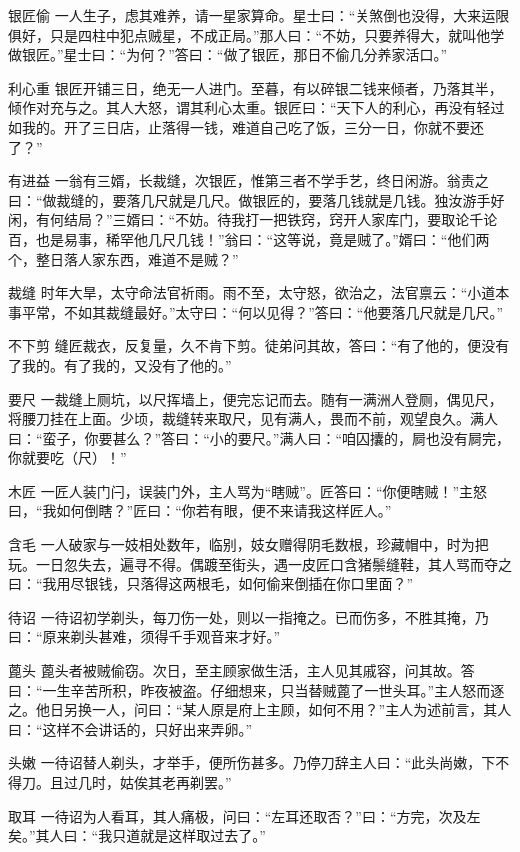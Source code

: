 \documentclass[12pt,UTF8]{ctexbook}
\begin{document}
银匠偷
一人生子，虑其难养，请一星家算命。星士曰：“关煞倒也没得，大来运限俱好，只是四柱中犯点贼星，不成正局。”那人曰：“不妨，只要养得大，就叫他学做银匠。”星士曰：“为何？”答曰：“做了银匠，那日不偷几分养家活口。”

利心重
银匠开铺三日，绝无一人进门。至暮，有以碎银二钱来倾者，乃落其半，倾作对充与之。其人大怒，谓其利心太重。银匠曰：“天下人的利心，再没有轻过如我的。开了三日店，止落得一钱，难道自己吃了饭，三分一日，你就不要还了？”

有进益
一翁有三婿，长裁缝，次银匠，惟第三者不学手艺，终日闲游。翁责之曰：“做裁缝的，要落几尺就是几尺。做银匠的，要落几钱就是几钱。独汝游手好闲，有何结局？”三婿曰：“不妨。待我打一把铁窍，窍开人家库门，要取论千论百，也是易事，稀罕他几尺几钱！”翁曰：“这等说，竟是贼了。”婿曰：“他们两个，整日落人家东西，难道不是贼？”

裁缝
时年大旱，太守命法官祈雨。雨不至，太守怒，欲治之，法官禀云：“小道本事平常，不如其裁缝最好。”太守曰：“何以见得？”答曰：“他要落几尺就是几尺。”

不下剪
缝匠裁衣，反复量，久不肯下剪。徒弟问其故，答曰：“有了他的，便没有了我的。有了我的，又没有了他的。”

要尺
一裁缝上厕坑，以尺挥墙上，便完忘记而去。随有一满洲人登厕，偶见尺，将腰刀挂在上面。少顷，裁缝转来取尺，见有满人，畏而不前，观望良久。满人曰：“蛮子，你要甚么？”答曰：“小的要尺。”满人曰：“咱囚攮的，屙也没有屙完，你就要吃（尺）！”

木匠
一匠人装门闩，误装门外，主人骂为“瞎贼”。匠答曰：“你便瞎贼！”主怒曰，“我如何倒瞎？”匠曰：“你若有眼，便不来请我这样匠人。”

含毛
一人破家与一妓相处数年，临别，妓女赠得阴毛数根，珍藏帽中，时为把玩。一日忽失去，遍寻不得。偶踱至街头，遇一皮匠口含猪鬃缝鞋，其人骂而夺之曰：“我用尽银钱，只落得这两根毛，如何偷来倒插在你口里面？”

待诏
一待诏初学剃头，每刀伤一处，则以一指掩之。已而伤多，不胜其掩，乃曰：“原来剃头甚难，须得千手观音来才好。”

蓖头
蓖头者被贼偷窃。次日，至主顾家做生活，主人见其戚容，问其故。答曰：“一生辛苦所积，昨夜被盗。仔细想来，只当替贼蓖了一世头耳。”主人怒而逐之。他日另换一人，问曰：“某人原是府上主顾，如何不用？”主人为述前言，其人曰：“这样不会讲话的，只好出来弄卵。”

头嫩
一待诏替人剃头，才举手，便所伤甚多。乃停刀辞主人曰：“此头尚嫩，下不得刀。且过几时，姑俟其老再剃罢。”

取耳
一待诏为人看耳，其人痛极，问曰：“左耳还取否？”曰：“方完，次及左矣。”其人曰：“我只道就是这样取过去了。”
\end{document}

